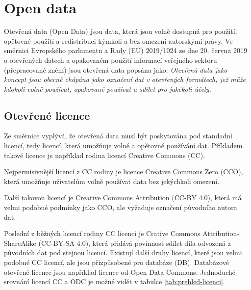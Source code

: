 \section{Open data}

Otevřená data (Open Data) jsou data, která jsou volně dostupná pro použití, opětovné použití a redistribuci kýmkoli a bez omezení autorskými právy. \parencite{CoJsouOtevrena2022} Ve směrnici Evropského parlamentu a Rady (EU) 2019/1024 ze dne 20. června 2019 o otevřených datech a opakovaném použití informací veřejného sektoru (přepracované znění) jsou otevřená data popsána jako: \textit{Otevřená data jako koncept jsou obecně chápána jako označení dat v otevřených formátech, jež může kdokoli volně používat, opakovaně používat a sdílet pro jakékoli účely.} \parencite[důvod č.~16]{SmerniceEvropskehoParlamentu2019}
 
\FloatBarrier
\subsection{Otevřené licence}
Ze směrnice vyplývá, že otevřená data musí být poskytována pod standadní licencí, tedy licencí, která umožňuje volné a opětovné používání dat. \parencite[důvod č.~44]{SmerniceEvropskehoParlamentu2019} Příkladem takové licence je například rodina licencí Creative Commons (CC).

Nejpermisivnější licencí z CC rodiny je licence Creative Commons Zero (CCO), která umožňuje uživatelům volně používat data bez jekýchkoli omezení. \parencite{DeedCC010}

Další takovou licencí je Creative Commons Attribution (CC-BY 4.0), která má velmi podobné podmínky jako CCO, ale vyžaduje označení původního autora dat. \parencite{DeedAttribution40}

Poslední z běžných licencí rodiny CC licencí je Crative Commons Attribution-ShareAlike (CC-BY-SA 4.0), která přidává povinnost sdílet díla odvozená z původních dat pod stejnou licencí. \parencite{DeedAttributionShareAlike40} Existují další druhy licencí, které jsou velmi podobné CC licencí, ale jsou přizpůsobené pro databáze (DB). Databázové otevřené licence jsou například licence od Open Data Commons. Jednoduché srovnání licencí CC a ODC je možné vidět v tabulce \ref{tab:prehled-licenci}. \parencite{ReusersGuideOpen2013,CCLicenses}

